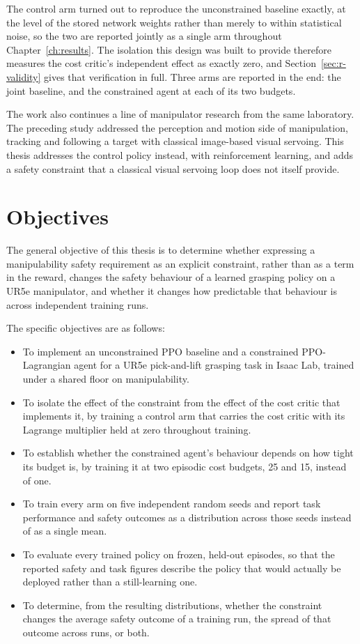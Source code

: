 The control arm turned out to reproduce the unconstrained baseline exactly, at the level of the
stored network weights rather than merely to within statistical noise, so the two are reported
jointly as a single arm throughout Chapter~\ref{ch:results}. The isolation this design was built
to provide therefore measures the cost critic's independent effect as exactly zero, and
Section~\ref{sec:r-validity} gives that verification in full. Three arms are reported in the end:
the joint baseline, and the constrained agent at each of its two budgets.

The work also continues a line of manipulator research from the same laboratory. The preceding
study \cite{khan2025csrt_ibvs} addressed the perception and motion side of manipulation, tracking
and following a target with classical image-based visual servoing. This thesis addresses the
control policy instead, with reinforcement learning, and adds a safety constraint that a classical
visual servoing loop does not itself provide.

\section{Objectives}\label{sec:i-objectives}

The general objective of this thesis is to determine whether expressing a manipulability safety
requirement as an explicit constraint, rather than as a term in the reward, changes the safety
behaviour of a learned grasping policy on a UR5e manipulator, and whether it changes how
predictable that behaviour is across independent training runs.

The specific objectives are as follows:

\begin{itemize}
  \item To implement an unconstrained PPO baseline and a constrained PPO-Lagrangian agent for a
  UR5e pick-and-lift grasping task in Isaac Lab, trained under a shared floor on manipulability.
  \item To isolate the effect of the constraint from the effect of the cost critic that implements
  it, by training a control arm that carries the cost critic with its Lagrange multiplier held at
  zero throughout training.
  \item To establish whether the constrained agent's behaviour depends on how tight its budget is,
  by training it at two episodic cost budgets, 25 and 15, instead of one.
  \item To train every arm on five independent random seeds and report task performance and safety
  outcomes as a distribution across those seeds instead of as a single mean.
  \item To evaluate every trained policy on frozen, held-out episodes, so that the reported safety
  and task figures describe the policy that would actually be deployed rather than a
  still-learning one.
  \item To determine, from the resulting distributions, whether the constraint changes the average
  safety outcome of a training run, the spread of that outcome across runs, or both.
\end{itemize}

